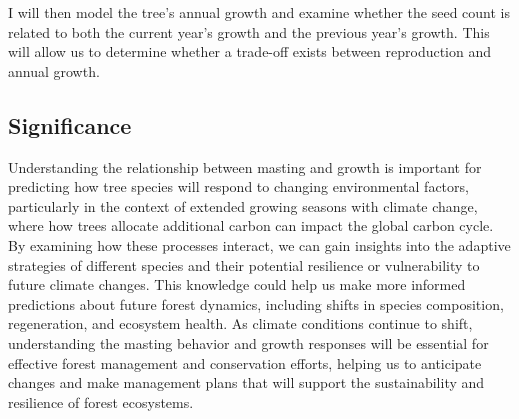\documentclass[11pt,letter]{article}
\begin{document}
I  will then model the tree's annual growth and examine whether the seed count is related to both the current year's growth and the previous year's growth. This will allow us to determine whether a trade-off exists between reproduction and annual growth.
\subsection{Significance}
Understanding the relationship between masting and growth is important for predicting how tree species will respond to changing environmental factors, particularly in the context of extended growing seasons with climate change, where how trees allocate additional carbon can impact the global carbon cycle. By examining how these processes interact, we can gain insights into the adaptive strategies of different species and their potential resilience or vulnerability to future climate changes. This knowledge could help us make more informed predictions about future forest dynamics, including shifts in species composition, regeneration, and ecosystem health. As climate conditions continue to shift, understanding the  masting behavior and growth responses will be essential for effective forest management and conservation efforts, helping us to anticipate changes and make management plans that will support the sustainability and resilience of forest ecosystems.\par
\end{document}
